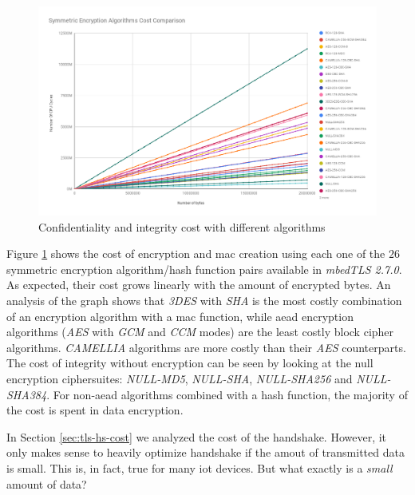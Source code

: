 \documentclass{llncs}
\begin{document}
\begin{figure}
  \centering
  \includegraphics[width=1.0\textwidth]{img/sym_algs_cc.png}
  \centering \caption{\label{fig:symm-encr-all} Confidentiality and integrity cost with different algorithms}
\end{figure}

Figure \ref{fig:symm-encr-all} shows the cost of encryption and \gls{mac} creation using each one of the $26$ symmetric encryption 
algorithm/hash function pairs available in \textit{mbedTLS 2.7.0}. As expected, their cost grows linearly with the amount of encrypted bytes.
An analysis of the graph shows that \textit{3DES} with \textit{SHA} is the most costly combination of an encryption algorithm with a \gls{mac} function, 
while \gls{aead} encryption algorithms 
(\textit{AES} with \textit{GCM} and \textit{CCM} modes) are the least costly block cipher algorithms. 
\textit{CAMELLIA} algorithms are more costly than their \textit{AES} counterparts.  The cost of integrity without encryption can be seen by looking at the null
encryption ciphersuites: \textit{NULL-MD5}, \textit{NULL-SHA}, \textit{NULL-SHA256} and \textit{NULL-SHA384}.
For non-\gls{aead} algorithms combined with a hash function, the majority of the cost is spent in data encryption.

In Section \ref{sec:tls-hs-cost} we analyzed the cost of the handshake. However, it only makes sense to heavily optimize handshake
if the amout of transmitted data is small. This is, in fact, true for many \gls{iot} devices. But what exactly is a \textit{small} amount of data?
\end{document}
